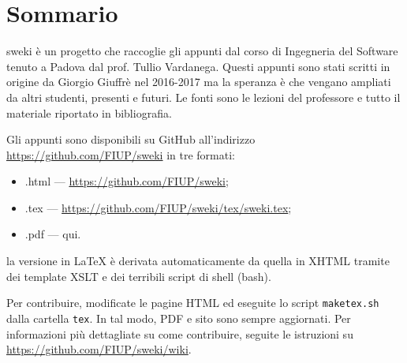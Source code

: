 \section{Sommario}
sweki è un progetto che raccoglie gli appunti dal corso di Ingegneria del Software tenuto a Padova dal prof. Tullio Vardanega. Questi appunti sono stati scritti in origine da Giorgio Giuffrè nel 2016-2017 ma la speranza è che vengano ampliati da altri studenti, presenti e futuri. Le fonti sono le lezioni del professore e tutto il materiale riportato in bibliografia.

Gli appunti sono disponibili su GitHub all'indirizzo \url{https://github.com/FIUP/sweki} in tre formati:
\begin{itemize}
	\item .html --- \url{https://github.com/FIUP/sweki};
	\item .tex --- \url{https://github.com/FIUP/sweki/tex/sweki.tex};
	\item .pdf --- qui.
\end{itemize}

la versione in \LaTeX{} è derivata automaticamente da quella in XHTML tramite dei template XSLT e dei terribili script di shell (bash).

Per contribuire, modificate le pagine HTML ed eseguite lo script \texttt{maketex.sh} dalla cartella \texttt{tex}. In tal modo, PDF e sito sono sempre aggiornati. Per informazioni più dettagliate su come contribuire, seguite le istruzioni su \url{https://github.com/FIUP/sweki/wiki}.
